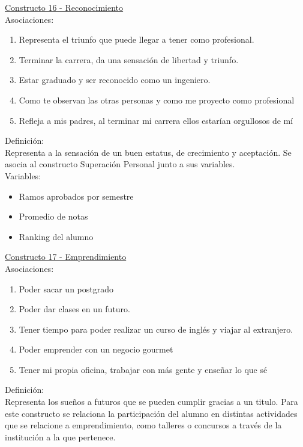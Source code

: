 \underline {Constructo 16 - Reconocimiento} \\
Asociaciones:
\begin{enumerate}
	\item Representa el triunfo que puede llegar a tener como profesional.
	\item Terminar la carrera, da una sensación de libertad y triunfo. 
	\item Estar graduado y ser reconocido como un ingeniero.
	\item Como te observan las otras personas y como me proyecto como profesional	
	\item Refleja a mis padres, al terminar mi carrera ellos estarían orgullosos de mí
\end{enumerate}

Definición:\\
Representa a la sensación de un buen estatus, de crecimiento y aceptación. Se asocia al constructo Superación Personal junto a sus variables.\\

Variables:
\begin{itemize}
	\item Ramos aprobados por semestre
	\item Promedio de notas
	\item Ranking del alumno	
\end{itemize} 

\underline {Constructo 17 - Emprendimiento} \\
Asociaciones:
\begin{enumerate}
	\item Poder sacar un postgrado
	\item Poder dar clases en un futuro.
	\item Tener tiempo para poder realizar un curso de inglés y viajar al extranjero.
	\item Poder emprender con un negocio gourmet
	\item Tener mi propia oficina, trabajar con más gente y enseñar lo que sé	
\end{enumerate}

Definición:\\
Representa los sueños a futuros que se pueden cumplir gracias a un titulo. Para este constructo se relaciona la participación del alumno en distintas actividades que se relacione a emprendimiento, como talleres o concursos a través de la institución a la que pertenece.\\

